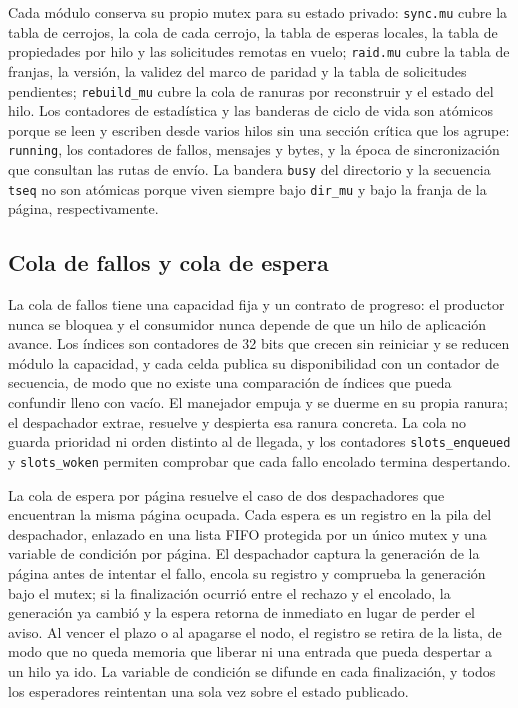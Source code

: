 Cada módulo conserva su propio mutex para su estado privado: \texttt{sync.mu} cubre la tabla de cerrojos, la cola de cada cerrojo, la tabla de esperas locales, la tabla de propiedades por hilo y las solicitudes remotas en vuelo; \texttt{raid.mu} cubre la tabla de franjas, la versión, la validez del marco de paridad y la tabla de solicitudes pendientes; \texttt{rebuild\_mu} cubre la cola de ranuras por reconstruir y el estado del hilo. Los contadores de estadística y las banderas de ciclo de vida son atómicos porque se leen y escriben desde varios hilos sin una sección crítica que los agrupe: \texttt{running}, los contadores de fallos, mensajes y bytes, y la época de sincronización que consultan las rutas de envío. La bandera \texttt{busy} del directorio y la secuencia \texttt{tseq} no son atómicas porque viven siempre bajo \texttt{dir\_mu} y bajo la franja de la página, respectivamente.

\subsection{Cola de fallos y cola de espera}

La cola de fallos tiene una capacidad fija y un contrato de progreso: el productor nunca se bloquea y el consumidor nunca depende de que un hilo de aplicación avance. Los índices son contadores de 32 bits que crecen sin reiniciar y se reducen módulo la capacidad, y cada celda publica su disponibilidad con un contador de secuencia, de modo que no existe una comparación de índices que pueda confundir lleno con vacío. El manejador empuja y se duerme en su propia ranura; el despachador extrae, resuelve y despierta esa ranura concreta. La cola no guarda prioridad ni orden distinto al de llegada, y los contadores \texttt{slots\_enqueued} y \texttt{slots\_woken} permiten comprobar que cada fallo encolado termina despertando.

La cola de espera por página resuelve el caso de dos despachadores que encuentran la misma página ocupada. Cada espera es un registro en la pila del despachador, enlazado en una lista FIFO protegida por un único mutex y una variable de condición por página. El despachador captura la generación de la página antes de intentar el fallo, encola su registro y comprueba la generación bajo el mutex; si la finalización ocurrió entre el rechazo y el encolado, la generación ya cambió y la espera retorna de inmediato en lugar de perder el aviso. Al vencer el plazo o al apagarse el nodo, el registro se retira de la lista, de modo que no queda memoria que liberar ni una entrada que pueda despertar a un hilo ya ido. La variable de condición se difunde en cada finalización, y todos los esperadores reintentan una sola vez sobre el estado publicado.

